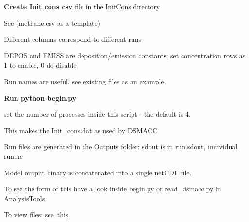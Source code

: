 \begin{DoxyEnumerate}
\item {\bfseries Create Init cons csv} file in the Init\+Cons directory
\begin{DoxyItemize}
\item See (methane.\+csv as a template)
\item Different columns correspond to different runs
\item D\+E\+P\+OS and E\+M\+I\+SS are deposition/emission constants; set concentration rows as 1 to enable, 0 do disable
\item Run names are useful, see existing files as an example.
\end{DoxyItemize}
\item {\bfseries Run {\ttfamily python begin.\+py}}
\begin{DoxyItemize}
\item set the number of processes inside this script -\/ the default is 4.
\item This makes the {\ttfamily Init\+\_\+cons.\+dat} as used by D\+S\+M\+A\+CC
\item Run files are generated in the Outputs folder\+: sdout is in run.\+sdout, individual run.\+nc
\item Model output binary is concatenated into a single net\+C\+DF file.
\item To see the form of this have a look inside begin.\+py or read\+\_\+dsmacc.\+py in Analysis\+Tools
\end{DoxyItemize}
\item To view files\+: \mbox{\hyperlink{md_src_docs_view_results}{see this}} 
\end{DoxyEnumerate}